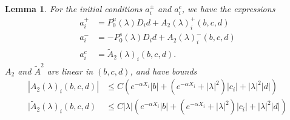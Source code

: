 \documentclass[10pt,reqno]{amsart}
\theoremstyle{plain}
\newtheorem{lemma}[theorem]{Lemma}
\theoremstyle{definition}
\theoremstyle{remark}
\numberwithin{theorem}{section}
\numberwithin{equation}{section}
\begin{document}
\begin{lemma}\label{lemma:aipm}
For the initial conditions $a_i^\pm$ and $a_i^c$, we have the expressions
\begin{equation}\label{aipmexp1}
\begin{aligned}
a_i^+ &= P_0^u(\lambda) D_i d + A_2(\lambda)_i^+(b, c, d) \\
a_i^- &= -P_0^s(\lambda) D_i d + A_2(\lambda)_i^-(b, c, d) \\
a_i^c &= \tilde{A}_2(\lambda)_i(b, c, d).
\end{aligned}
\end{equation}
$A_2$ and $\tilde{A}^2$ are linear in $(b, c, d)$, and have bounds
\begin{align}
|A_2(\lambda)_i(b, c, d)|
&\leq C \left(e^{-\alpha X_i}|b| + (e^{-\alpha X_i} + |\lambda|^2)|c_i| + |\lambda|^2|d| \right) \label{A2bound} \\
|\tilde{A}_2(\lambda)_i(b, c, d) &\leq C |\lambda| \left( e^{-\alpha X_i} |b| + (e^{-\alpha X_i} + |\lambda|^2) |c_i| +|\lambda|^2 |d| \right) \label{tildeA2bound}
\end{align}


\end{lemma}
\end{document}
